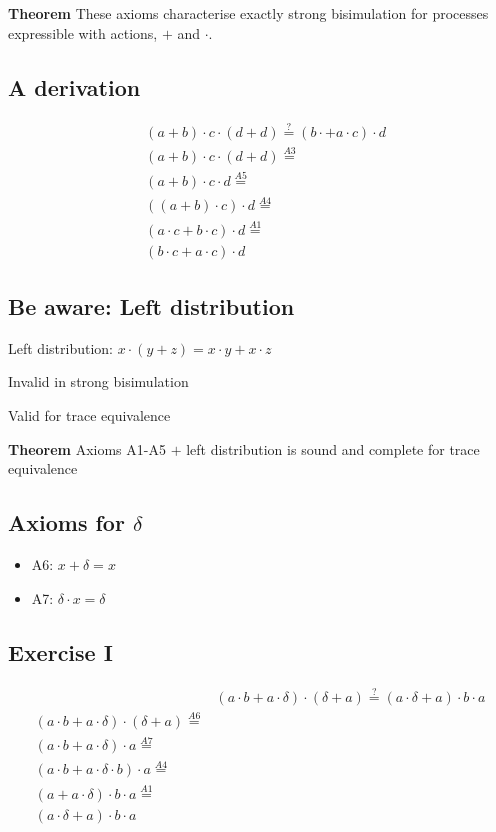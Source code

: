 \textbf{Theorem} These axioms characterise exactly strong bisimulation for processes expressible
with actions, $+$ and $\cdot$.

\subsection{A derivation}

\begin{align*}
  &(a + b) \cdot c \cdot (d + d) \overset{?}{=} (b \cdot + a \cdot c) \cdot d \\
  &(a + b) \cdot c \cdot (d + d) \overset{A3}{=} \\
  &(a + b) \cdot c \cdot d \overset{A5}{=} \\
  &((a + b) \cdot c) \cdot d \overset{A4}{=} \\
  &(a \cdot c + b \cdot c) \cdot d \overset{A1}{=} \\
  &(b \cdot c + a \cdot c) \cdot d
\end{align*}

\subsection{Be aware: Left distribution}

Left distribution: $x \cdot (y + z) = x \cdot y + x \cdot z$

Invalid in strong bisimulation

Valid for trace equivalence

\textbf{Theorem} Axioms A1-A5 $+$ left distribution is sound and complete for trace equivalence

\subsection{Axioms for $\delta$}

\begin{itemize}
  \item A6: $x + \delta = x$
  \item A7: $\delta \cdot x = \delta$
\end{itemize}

\subsection{Exercise I}

\begin{align*}
  & (a \cdot b + a \cdot \delta) \cdot (\delta + a) \overset{?}{=} (a \cdot \delta + a)\cdot b \cdot a \\
  (a \cdot b + a \cdot \delta) \cdot (\delta + a) \overset{A6}{=} \\
  (a \cdot b + a \cdot \delta) \cdot a \overset{A7}{=} \\
  (a \cdot b + a \cdot \delta \cdot b) \cdot a \overset{A4}{=} \\
  (a + a \cdot \delta) \cdot b \cdot a \overset{A1}{=} \\
  (a \cdot \delta + a) \cdot b \cdot a
\end{align*}

